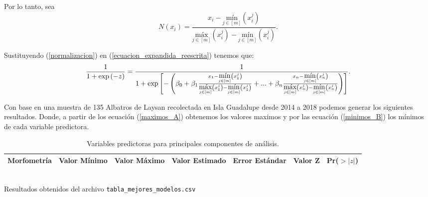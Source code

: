 \documentclass{article}
\begin{document}
\begin{flushleft}
Por lo tanto, sea 
\begin{equation} \label{normalizacion} N\left ( x_{i} \right )= \frac{x_{i} - \underset{j\in [m ]}{\mbox{mín}}\left (  x_{i}^{j}\right )}{\underset{j\in [m ]}{\mbox{máx}}\left (  x_{i}^{j}\right )-\underset{j\in [m ]}{\mbox{mín}}\left (  x_{i}^{j}\right )} .
\end{equation}

Sustituyendo (\ref{normalizacion}) en (\ref{ecuacion_expandida_reescrita}) tenemos que: 
\begin{equation} \label{ecuacion_chorizo}
    \frac{1}{1+\mbox{\mbox{exp}}\left ( -z\right )} = \frac{1}{1+\mbox{exp}\left [ -\left ( \beta _{0} + \beta _{1}\frac{x_{1}- \underset{j\in [m]}{\mbox{mín}}\left (x_{1}^{j}\right )}{\underset{j\in [m ]}{\mbox{máx}}\left (x_{1}^{j}\right )-\underset{j\in [m]}{\mbox{mín}}\left (  x_{1}^{j}\right )}+...+\beta_{n}\frac{x_{n} - \underset{j\in [m]}{\mbox{mín}}\left (  x_{n}^{j}\right )}{\underset{j\in [m]}{\mbox{máx}}\left (  x_{n}^{j}\right )-\underset{j\in [m]}{\mbox{mín}}\left (  x_{n}^{j}\right )}\right ) \right ]} .
\end{equation}


\newpage
Con base en una muestra de 135 Albatros de Laysan recolectada en Isla Guadalupe desde 2014 a 2018 podemos generar los siguientes resultados.
Donde, a partir de los ecuación (\ref{maximos_A}) obtenemos los valores maximos y por las ecuación (\ref{minimos_B}) los mínimos de cada variable predictora.

\begin{table}[ht]
    \centering
    \caption{Variables predictoras para principales componentes de análisis.}
    \bigskip
    \begin{adjustbox}{width=1\textwidth}
    \renewcommand{\arraystretch}{1.3}
    \begin{tabular}{|c|c|c|c|c|c|c|}
    \hline
    \textbf{Morfometría} & \textbf{Valor Mínimo} & \textbf{Valor Máximo} & \textbf{Valor Estimado} & \textbf{Error Estándar} & \textbf{Valor Z} & \textbf{Pr($>\left|z\right|$)} \\
    \hline
    
    \end{tabular}
    \end{adjustbox}
    \\[10pt]
    Resultados obtenidos del archivo \texttt{tabla\_mejores\_modelos.csv}
    \label{modeloLogistico}
\end{table}



\end{flushleft}
\end{document}
